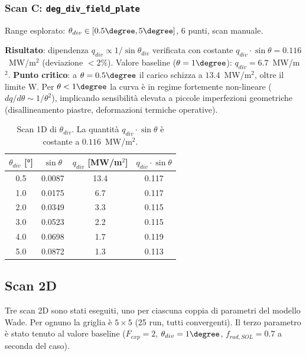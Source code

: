 \subsubsection{Scan C: \texttt{deg\_div\_field\_plate}}

Range esplorato: $\theta_{div} \in [0.5\degree, 5\degree]$, 6 punti,
scan manuale.

\textbf{Risultato}: dipendenza $q_{div} \propto 1/\sin\theta_{div}$
verificata con costante $q_{div} \cdot \sin\theta = 0.116$~MW/m$^2$
(deviazione $< 2\%$). Valore baseline ($\theta = 1\degree$):
$q_{div} = 6.7$~MW/m$^2$. \textbf{Punto critico}: a $\theta = 0.5\degree$
il carico schizza a $13.4$~MW/m$^2$, oltre il limite W. Per $\theta < 1\degree$
la curva è in regime fortemente non-lineare ($dq/d\theta \sim 1/\theta^2$),
implicando sensibilità elevata a piccole imperfezioni geometriche
(disallineamento piastre, deformazioni termiche operative).

\begin{table}[h]
    \centering
    \caption{Scan 1D di $\theta_{div}$. La quantità $q_{div} \cdot \sin\theta$
             è costante a $0.116$~MW/m$^2$.}
    \begin{tabular}{cccc}
        \toprule
        $\theta_{div}$ [°] & $\sin\theta$ & $q_{div}$ [MW/m$^2$] &
        $q_{div} \cdot \sin\theta$ \\
        \midrule
        0.5 & 0.0087 & 13.4 & 0.117 \\
        1.0 & 0.0175 &  6.7 & 0.117 \\
        2.0 & 0.0349 &  3.3 & 0.115 \\
        3.0 & 0.0523 &  2.2 & 0.115 \\
        4.0 & 0.0698 &  1.7 & 0.119 \\
        5.0 & 0.0872 &  1.3 & 0.113 \\
        \bottomrule
    \end{tabular}
\end{table}

\subsection{Scan 2D}

Tre scan 2D sono stati eseguiti, uno per ciascuna coppia di parametri
del modello Wade. Per ognuno la griglia è $5 \times 5$ (25 run, tutti
convergenti). Il terzo parametro è stato tenuto al valore baseline
($F_{exp} = 2$, $\theta_{div} = 1\degree$, $f_{rad,SOL} = 0.7$ a seconda
del caso).

